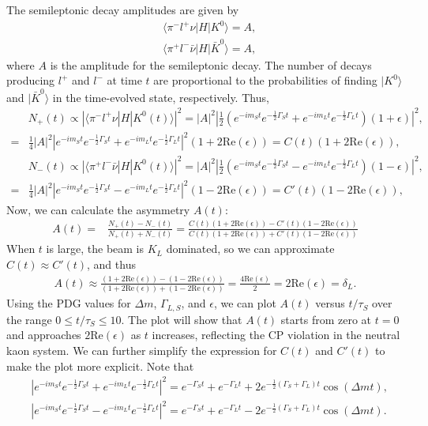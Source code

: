 The semileptonic decay amplitudes are given by
\begin{align}
    &\langle \pi^- l^+ \nu|H|K^0\rangle = A, \\
    &\langle \pi^+ l^- \bar{\nu}|H|\bar{K}^0\rangle = A,
\end{align}
where $A$ is the amplitude for the semileptonic decay. The number of decays producing $l^+$ and $l^-$ at time $t$ are proportional to the probabilities of finding $|K^0\rangle$ and $|\bar{K}^0\rangle$ in the time-evolved state, respectively. Thus,
\begin{align}
    &N_+(t) \propto |\langle \pi^- l^+ \nu|H|K^0(t)\rangle|^2 = |A|^2 \left|\frac{1}{2}(e^{-i m_S t} e^{-\frac{1}{2}\Gamma_S t} + e^{-i m_L t} e^{-\frac{1}{2}\Gamma_L t})(1+\epsilon)\right|^2, \\
    =& \frac{1}{4} |A|^2  |e^{-i m_S t} e^{-\frac{1}{2}\Gamma_S t} + e^{-i m_L t} e^{-\frac{1}{2}\Gamma_L t}|^2 (1 + 2\text{Re}(\epsilon))=C(t)(1 + 2\text{Re}(\epsilon)),\\
    &N_-(t) \propto |\langle \pi^+ l^- \bar{\nu}|H|K^0(t)\rangle|^2 = |A|^2 \left|\frac{1}{2}(e^{-i m_S t} e^{-\frac{1}{2}\Gamma_S t} - e^{-i m_L t} e^{-\frac{1}{2}\Gamma_L t})(1-\epsilon)\right|^2, \\
    =& \frac{1}{4} |A|^2  |e^{-i m_S t} e^{-\frac{1}{2}\Gamma_S t} - e^{-i m_L t} e^{-\frac{1}{2}\Gamma_L t}|^2 (1 - 2\text{Re}(\epsilon))=C'(t)(1 - 2\text{Re}(\epsilon)),
\end{align}
Now, we can calculate the asymmetry $A(t)$:
\begin{align}
    A(t) =& \frac{N_+(t) - N_-(t)}{N_+(t) + N_-(t)} = \frac{C(t)(1 + 2\text{Re}(\epsilon)) - C'(t)(1 - 2\text{Re}(\epsilon))}{C(t)(1 + 2\text{Re}(\epsilon)) + C'(t)(1 - 2\text{Re}(\epsilon))}
\end{align}
When $t$ is large, the beam is $K_L$ dominated, so we can approximate $C(t) \approx C'(t)$, and thus
\begin{align}
    A(t) \approx \frac{(1 + 2\text{Re}(\epsilon)) - (1 - 2\text{Re}(\epsilon))}{(1 + 2\text{Re}(\epsilon)) + (1 - 2\text{Re}(\epsilon))} = \frac{4\text{Re}(\epsilon)}{2} = 2\text{Re}(\epsilon) = \delta_L.
\end{align}
Using the PDG values for $\Delta m$, $\Gamma_{L,S}$, and $\epsilon$, we can plot $A(t)$ versus $t/\tau_S$ over the range $0 \leq t/\tau_S \leq 10$. The plot will show that $A(t)$ starts from zero at $t=0$ and approaches $2\text{Re}(\epsilon)$ as $t$ increases, reflecting the CP violation in the neutral kaon system. We can further simplify the expression for $C(t)$ and $C'(t)$ to make the plot more explicit. Note that 
\begin{align}
    &|e^{-i m_S t} e^{-\frac{1}{2}\Gamma_S t} + e^{-i m_L t} e^{-\frac{1}{2}\Gamma_L t}|^2 = e^{-\Gamma_S t} + e^{-\Gamma_L t} + 2e^{-\frac{1}{2}(\Gamma_S + \Gamma_L)t}\cos(\Delta m t), \\
    &|e^{-i m_S t} e^{-\frac{1}{2}\Gamma_S t} - e^{-i m_L t} e^{-\frac{1}{2}\Gamma_L t}|^2 = e^{-\Gamma_S t} + e^{-\Gamma_L t} - 2e^{-\frac{1}{2}(\Gamma_S + \Gamma_L)t}\cos(\Delta m t).
\end{align}


